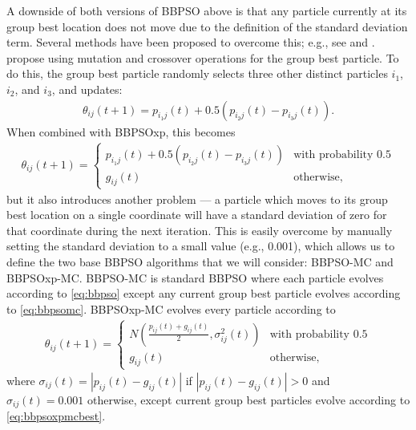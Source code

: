 \documentclass[12pt]{article}
\begin{document}
A downside of both versions of BBPSO above is that any particle currently at its group best location does not move due to the definition of the standard deviation term. Several methods have been proposed to overcome this; e.g., see \citet{hsieh2010modified} and \citet{zhang2011novel}. \citet{zhang2011novel} propose using mutation and crossover operations for the group best particle. To do this, the group best particle randomly selects three other distinct particles $i_1$, $i_2$, and $i_3$, and updates:
\begin{align}\label{eq:bbpsomc}
\theta_{ij}(t+1) = p_{i_1j}(t) + 0.5(p_{i_2j}(t) - p_{i_3j}(t)).
\end{align}
When combined with BBPSOxp, this becomes
\begin{align}\label{eq:bbpsoxpmcbest}
\theta_{ij}(t+1) = \begin{cases} p_{i_1j}(t) + 0.5(p_{i_2j}(t) - p_{i_3j}(t)) & \mbox{with probability }0.5\\
g_{ij}(t) &\mbox{otherwise,}\end{cases}
\end{align}
but it also introduces another problem --- a particle which moves to its group best location on a single coordinate will have a standard deviation of zero for that coordinate during the next iteration. This is easily overcome by manually setting the standard deviation to a small value (e.g., 0.001), which allows us to define the two base BBPSO algorithms that we will consider: BBPSO-MC and BBPSOxp-MC. BBPSO-MC is standard BBPSO where each particle evolves according to \eqref{eq:bbpso} except any current group best particle evolves according to \eqref{eq:bbpsomc}. BBPSOxp-MC evolves every particle according to 
\begin{align}\label{eq:bbpsoxpmcall}
\theta_{ij}(t+1) = \begin{cases} N\left(\frac{p_{ij}(t) + g_{ij}(t)}{2}, \sigma^2_{ij}(t)\right) & \mbox{with probability }0.5\\
g_{ij}(t) &\mbox{otherwise,}\end{cases}
\end{align}
where $\sigma_{ij}(t) = |p_{ij}(t) - g_{ij}(t)|$ if $|p_{ij}(t) - g_{ij}(t)|>0$ and $\sigma_{ij}(t) = 0.001$ otherwise, except current group best particles evolve according to \eqref{eq:bbpsoxpmcbest}. 
\end{document}
